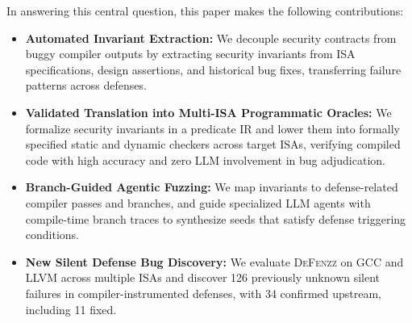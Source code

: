 \documentclass[conference]{IEEEtran}
\begin{document}
In answering this central question, this paper makes the following contributions:
\begin{itemize}
  \item \textbf{Automated Invariant Extraction:} We decouple security contracts from buggy compiler outputs by extracting security invariants from ISA specifications, design assertions, and historical bug fixes, transferring failure patterns across defenses.
  \item \textbf{Validated Translation into Multi-ISA Programmatic Oracles:} We formalize security invariants in a predicate IR and lower them into formally specified static and dynamic checkers across target ISAs, verifying compiled code with high accuracy and zero LLM involvement in bug adjudication.
  \item \textbf{Branch-Guided Agentic Fuzzing:} We map invariants to defense-related compiler passes and branches, and guide specialized LLM agents with compile-time branch traces to synthesize seeds that satisfy defense triggering conditions.
  \item \textbf{New Silent Defense Bug Discovery:} We evaluate \textsc{DeFenzz} on GCC and LLVM across multiple ISAs and discover 126 previously unknown silent failures in compiler-instrumented defenses, with 34 confirmed upstream, including 11 fixed.
\end{itemize}
\end{document}
